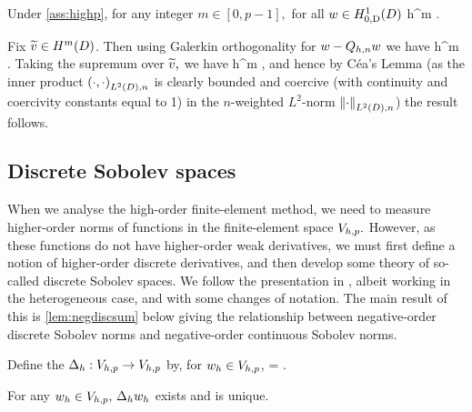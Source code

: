 
\label{lem:wltdprojerr}
Under \cref{ass:highp}, for any integer $m \in [0,p-1],$ for all $w \in \HozDD$
\beq\label{eq:wltdprojerr}
 \leq {} \frac{\nmax}{\nmin} h^{m} .
\eeq
\ele

Fix $\vtilde \in \HmD$. Then using Galerkin orthogonality for $w - Q_{h,n} w$ we have
\beqs%
 \leq {}\NLtDn{\vtilde-\Ih\vtilde}\leq {} \frac{\nmax}{\nmin} h^m \NHmDn{\vtilde}.
\eeqs%
Taking the supremum over $\widetilde{v},$ we have
\beqs
{} \leq {} \frac{\nmax}{\nmin} h^m ,
\eeqs
and hence by C\'ea's Lemma (as the inner product $\IPLtDn{\cdot}{\cdot}$ is clearly bounded and coercive (with continuity and coercivity constants equal to 1) in the $n$-weighted $L^2$-norm $\NLtDn{\cdot}$) the result follows.
\epf

\subsection{Discrete Sobolev spaces}\label{sec:discsob}
When we analyse the high-order finite-element method, we need to measure higher-order norms of functions in the finite-element space $V_{h,p}.$ However, as these functions do not have higher-order weak derivatives, we must first define a notion of higher-order discrete derivatives, and then develop some theory of so-called discrete Sobolev spaces. We follow the presentation in \cite{DuWu:15}, albeit working in the heterogeneous case, and with some changes of notation. The main result of this  is \cref{lem:negdiscsum} below giving the relationship between negative-order discrete Sobolev norms and negative-order continuous Sobolev norms.

Define the  $\Delta_{h}:V_{h,p}\rightarrow V_{h,p}$ by, for $w_{h} \in V_{h,p}$,
\beq\label{eq:discderdef}
\IPLtDn{\Deltah \wh}{\vh} =  \tforall \vh \in \Vhp.
\eeq
\ede

\label{lem:ddwd}
For any $w_{h} \in V_{h,p},$ $\Delta_{h} w_{h}$ exists and is unique.
\ele

